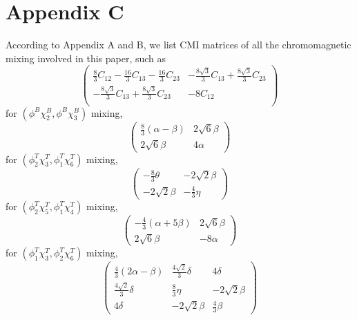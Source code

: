 \documentclass[prd,twocolumn,floatfix,nofootinbib]{revtex4}
\begin{document}
\section*{Appendix C}\label{AppendixC}
\setcounter{equation}{0}
\renewcommand{\theequation}{C\arabic{equation}}
According to Appendix A and B, we list CMI matrices of all the chromomagnetic mixing involved in this paper, such as
\begin{equation}\label{mixing23}
    \begin{pmatrix}
        \frac{8}{3}C_{12}-\frac{16}{3}C_{13}-\frac{16}{3}C_{23} & -\frac{8\sqrt{3}}{3}C_{13}+\frac{8\sqrt{3}}{3}C_{23} \\
        -\frac{8\sqrt{3}}{3}C_{13}+\frac{8\sqrt{3}}{3}C_{23} & -8C_{12} \\
    \end{pmatrix}
\end{equation}
for $(\phi^{B}\chi_{2}^{B},\phi^{B}\chi_{3}^{B})$ mixing,
\begin{equation}\label{21mixing36}
    \begin{pmatrix}
        \frac{8}{3}(\alpha-\beta)   & 2\sqrt{6}\beta \\
        2\sqrt{6}\beta              & 4\alpha
    \end{pmatrix}
\end{equation}
for $(\phi_{2}^{T}\chi_{3}^{T},\phi_{1}^{T}\chi_{6}^{T})$ mixing,
\begin{equation}\label{21mixing54}
    \begin{pmatrix}
        -\frac{8}{3}\theta  & -2\sqrt{2}\beta \\
        -2\sqrt{2}\beta     & -\frac{4}{3}\eta
    \end{pmatrix}
\end{equation}
for $(\phi_{2}^{T}\chi_{5}^{T},\phi_{1}^{T}\chi_{4}^{T})$ mixing,
\begin{equation}\label{12mixing36}
    \begin{pmatrix}
        -\frac{4}{3}(\alpha+5\beta) & 2\sqrt{6}\beta \\
        2\sqrt{6}\beta              & -8\alpha
    \end{pmatrix}
\end{equation}
for $(\phi_{1}^{T}\chi_{3}^{T},\phi_{2}^{T}\chi_{6}^{T})$ mixing,
\begin{equation}\label{221mixing245}
    \begin{pmatrix}
        \frac{4}{3}(2\alpha-\beta)  & \frac{4\sqrt{2}}{3}\delta & 4\delta \\
        \frac{4\sqrt{2}}{3}\delta   & \frac{8}{3}\eta           & -2\sqrt{2}\beta \\
        4\delta                     & -2\sqrt{2}\beta           & \frac{4}{3}\beta
    \end{pmatrix}
\end{equation}
\end{document}
